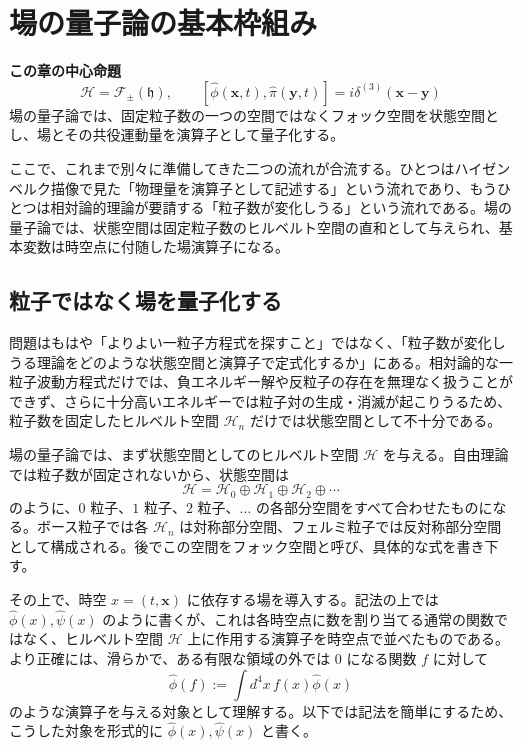 \section{場の量子論の基本枠組み}

\noindent\textbf{この章の中心命題}
\[
\boxed{
\mathcal{H}=\mathcal{F}_{\pm}(\mathfrak{h}),
\qquad
[\hat{\phi}(\mathbf{x},t),\hat{\pi}(\mathbf{y},t)]
=i\delta^{(3)}(\mathbf{x}-\mathbf{y})
}
\]
場の量子論では、固定粒子数の一つの空間ではなくフォック空間を状態空間とし、場とその共役運動量を演算子として量子化する。

ここで、これまで別々に準備してきた二つの流れが合流する。ひとつはハイゼンベルク描像で見た「物理量を演算子として記述する」という流れであり、もうひとつは相対論的理論が要請する「粒子数が変化しうる」という流れである。場の量子論では、状態空間は固定粒子数のヒルベルト空間の直和として与えられ、基本変数は時空点に付随した場演算子になる。

\subsection{粒子ではなく場を量子化する}
問題はもはや「よりよい一粒子方程式を探すこと」ではなく、「粒子数が変化しうる理論をどのような状態空間と演算子で定式化するか」にある。相対論的な一粒子波動方程式だけでは、負エネルギー解や反粒子の存在を無理なく扱うことができず、さらに十分高いエネルギーでは粒子対の生成・消滅が起こりうるため、粒子数を固定したヒルベルト空間 $\mathcal{H}_n$ だけでは状態空間として不十分である。

場の量子論では、まず状態空間としてのヒルベルト空間 $\mathcal{H}$ を与える。自由理論では粒子数が固定されないから、状態空間は
\[
\mathcal{H}=\mathcal{H}_0\oplus \mathcal{H}_1\oplus \mathcal{H}_2\oplus\cdots
\]
のように、$0$ 粒子、$1$ 粒子、$2$ 粒子、$\dots$ の各部分空間をすべて合わせたものになる。ボース粒子では各 $\mathcal{H}_n$ は対称部分空間、フェルミ粒子では反対称部分空間として構成される。後でこの空間をフォック空間と呼び、具体的な式を書き下す。

その上で、時空 $x=(t,\mathbf{x})$ に依存する場を導入する。記法の上では $\hat{\phi}(x), \hat{\psi}(x)$ のように書くが、これは各時空点に数を割り当てる通常の関数ではなく、ヒルベルト空間 $\mathcal{H}$ 上に作用する演算子を時空点で並べたものである。より正確には、滑らかで、ある有限な領域の外では $0$ になる関数 $f$ に対して
\[
\hat{\phi}(f) := \int d^4x\, f(x)\hat{\phi}(x)
\]
のような演算子を与える対象として理解する。以下では記法を簡単にするため、こうした対象を形式的に $\hat{\phi}(x),\hat{\psi}(x)$ と書く。

